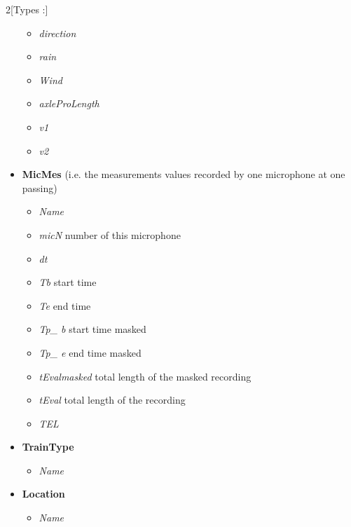 \documentclass{article}\usepackage[]{graphicx}\usepackage[]{color}
\begin{document}
\begin{multicols}{2}[Types :]
\begin{itemize}
\begin{itemize}
    \item {\it direction}
    \item {\it rain}
    \item {\it Wind}
    \item {\it axleProLength}
    \item {\it v1}
    \item {\it v2}
  \end{itemize}
\item {\bf MicMes} (i.e. the measurements values recorded by one microphone at one passing)
  \begin{itemize}
    \item {\it Name}
    \item {\it micN} number of this microphone    
    \item {\it dt}
    \item {\it Tb} start time
    \item {\it Te} end time
    \item {\it Tp\_ b} start time masked
    \item {\it Tp\_ e} end time masked
    \item {\it tEvalmasked} total length of the masked recording
    \item {\it tEval} total length of the recording
    \item {\it TEL}
  \end{itemize}
\item {\bf TrainType}
  \begin{itemize}
    \item {\it Name}
  \end{itemize}
\item {\bf Location}
  \begin{itemize}
    \item {\it Name}
  \end{itemize}
\end{itemize}
\end{multicols}
\end{document}
